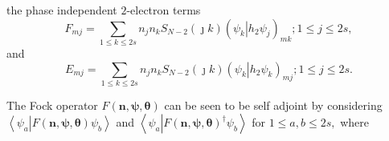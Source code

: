 \documentclass[aps,preprint]{revtex4}%
\begin{document}
the phase independent $2$-electron terms
\begin{equation}
F_{mj}=\sum_{1\leq k\leq2s}n_{j}n_{k}S_{N-2}\left(  \jmath k\right)  \left(
\left.  \psi_{k}\right\vert h_{2}\psi_{j}\right)  _{mk};1\leq j\leq2s,
\end{equation}
and%
\begin{equation}
E_{mj}=\sum_{1\leq k\leq2s}n_{j}n_{k}S_{N-2}\left(  \jmath k\right)  \left(
\left.  \psi_{k}\right\vert h_{2}\psi_{k}\right)  _{mj};1\leq j\leq2s.
\end{equation}


The Fock operator $F\left(  \mathbf{n},\mathbf{\psi},\mathbf{\theta}\right)  $
can be seen to be self adjoint by considering $\left\langle \psi_{a}\left\vert
F\left(  \mathbf{n},\mathbf{\psi},\mathbf{\theta}\right)  \psi_{b}\right.
\right\rangle $ and $\left\langle \psi_{a}\left\vert F\left(  \mathbf{n}%
,\mathbf{\psi},\mathbf{\theta}\right)  ^{\dagger}\psi_{b}\right.
\right\rangle $ for $1\leq a,b\leq2s,$ where
\end{document}
